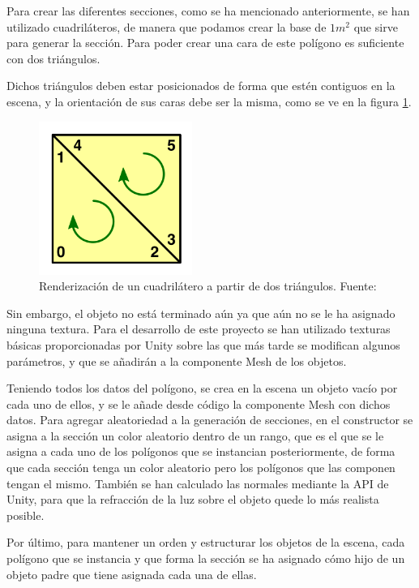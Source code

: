 \documentclass[../main.tex]{subfiles}
\begin{document}
Para crear las diferentes secciones, como se ha mencionado anteriormente, se han utilizado cuadriláteros, de manera que podamos crear la base de $1m^2$ que sirve para generar la sección. Para poder crear una cara de este polígono es suficiente con dos triángulos.

Dichos triángulos deben estar posicionados de forma que estén contiguos en la escena, y la orientación de sus caras debe ser la misma, como se ve en la figura \ref{fig:Quad_Render}.

\begin{figure}[h!]
\centering
\includegraphics[width=5cm, height=5cm]{imagenes/Quad_Render.png}
\caption{Renderización de un cuadrilátero a partir de dos triángulos. Fuente:\cite{Unity_Render}}
\label{fig:Quad_Render}
\end{figure}

Sin embargo, el objeto no está terminado aún ya que aún no se le ha asignado ninguna textura. Para el desarrollo de este proyecto se han utilizado texturas básicas proporcionadas por Unity sobre las que más tarde se modifican algunos parámetros, y que se añadirán a la componente Mesh de los objetos.

Teniendo todos los datos del polígono, se crea en la escena un objeto vacío por cada uno de ellos, y se le añade desde código la componente Mesh con dichos datos. Para agregar aleatoriedad a la generación de secciones, en el constructor se asigna a la sección un color aleatorio dentro de un rango, que es el que se le asigna a cada uno de los polígonos que se instancian posteriormente, de forma que cada sección tenga un color aleatorio pero los polígonos que las componen tengan el mismo. También se han calculado las normales mediante la API de Unity, para que la refracción de la luz sobre el objeto quede lo más realista posible.

Por último, para mantener un orden y estructurar los objetos de la escena, cada polígono que se instancia y que forma la sección se ha asignado cómo hijo de un objeto padre que tiene asignada cada una de ellas.
\end{document}
